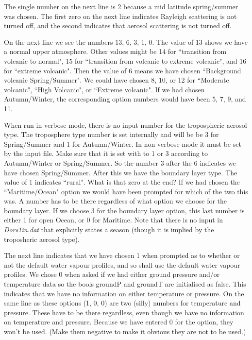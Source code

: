 \documentclass[12pt]{article}
\begin{document}
The single number on the next line is 2 because a mid latitude spring/summer was chosen.
The first zero on the next line indicates Rayleigh scattering is not turned off, and
the second indicates that aerosol scattering is not turned off.

On the next line we see the numbers 13, 6, 3, 1, 0.
The value of 13 shows we have a normal upper atmosphere. Other values might be 14 for ``transition
from volcanic to normal", 15 for ``transition from volcanic to extreme volcanic", and 16 for
 ``extreme volcanic". Then the value of 6 means we have chosen ``Background volcanic Spring/Summer".
We could have chosen 8, 10, or 12 for ``Moderate volcanic", ``High Volcanic", or ``Extreme volcanic".
If we had chosen Autumn/Winter, the corresponding option numbers would have been 5, 7, 9, and 11.

When run in verbose mode, there is no input number for the tropospheric aerosol type. 
The troposphere type number is set
internally and will be 
be 3 for Spring/Summer and 1 for Autumn/Winter. In non verbose mode it must be set by the input file.
Make sure that it is set with to 1 or 3 according to Autumn/Winter or Spring/Summer. 
So the number 3 after the 6 indicates we have chosen Spring/Summer. After this we have the boundary layer type.
The value of 1 indicates ``rural".
What is that zero at the end? If we had chosen the ``Maritime/Ocean" option we would have
been prompted for which of the two this was. A number has to be there regardless of what option
we choose for the boundary layer. If we choose 3 for the boundary layer option, this last number is
either 1 for open Ocean, or 0 for Maritime.
Note that there is no input in {\it Dors1in.dat} that explicitly states a season (though it is implied
by the troposheric aerosol type). 

The next line indicates that we have chosen 1 when prompted as to whether or not
the default water vapour profiles, and so shall use the default water vapour profiles. We chose 0 
when asked if we had either ground pressure and/or temperature data 
so the bools groundP and groundT are initialised as false.
 This indicates that  we have no information  on either temperature or pressure. 
On the same line as these options (1, 0, 0) 
are two (silly) numbers for
temperature and pressure. These have to be there regardless, even though we have no information
on temperature and pressure. Because we have entered 0 for the option, they won't be used.  
(Make them negative to make it obvious they are not to be used.)
\end{document}
